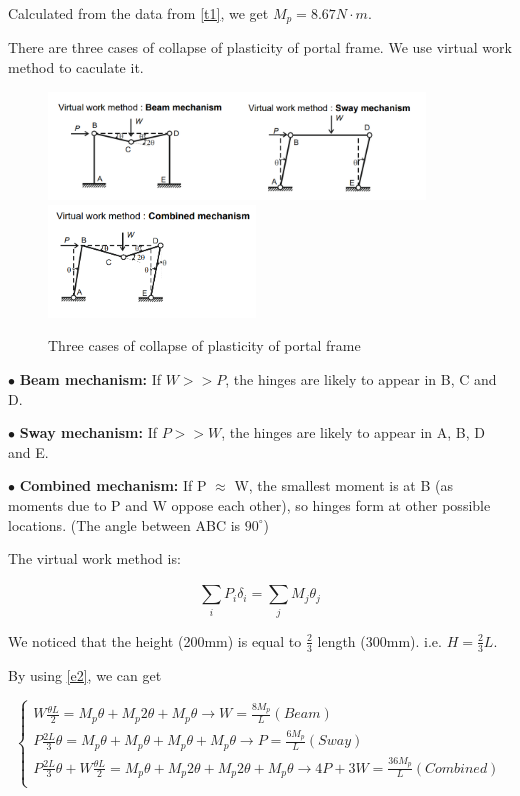 Calculated from the data from \autoref{t1}, we get $M_p=8.67N \cdot m$.

There are three cases of collapse of plasticity of portal frame. We use virtual work method to caculate it.

\begin{figure}[htbp]
    \centering
    \includegraphics[width=10cm]{./fig/12.png}
    \includegraphics[width=5.5cm]{./fig/13.png}
    \caption{Three cases of collapse of plasticity of portal frame}
    \label{f2}
\end{figure}


$\bullet$ \textbf{Beam mechanism:} If $W>>P$, the hinges are likely to appear in B, C and D.



$\bullet$ \textbf{Sway mechanism:} If $P>>W$, the hinges are likely to appear in A, B, D and E.




$\bullet$ \textbf{Combined mechanism:} If P $\approx$ W, the smallest moment
is at B (as moments due to P
and W oppose each other), so
hinges form at other possible
locations. (The angle between ABC is $90^\circ$)

The virtual work method is: 

\begin{equation}
    \sum_i^{}{P_i\delta_i}=\sum_j^{}{M_j\theta_j}
    \label{e2}
\end{equation}

We noticed that the height (200mm) is equal to $\frac{2}{3}$ length (300mm). i.e. $H=\frac{2}{3}L$.

By using \autoref{e2}, we can get

$$
\left\{ \begin{array}{l}
	W\frac{\theta L}{2}=M_p\theta+M_p2\theta+M_p\theta \rightarrow W=\frac{8M_p}{L} (Beam)\\
	P\frac{2L}{3}\theta=M_p\theta+M_p\theta+M_p\theta+M_p\theta \rightarrow P=\frac{6M_p}{L} (Sway)\\
	P\frac{2L}{3}\theta+W\frac{\theta L}{2}=M_p\theta+M_p2\theta+M_p2\theta+M_p\theta \rightarrow 4P+3W=\frac{36M_p}{L} (Combined)\\
\end{array} \right. 
$$

